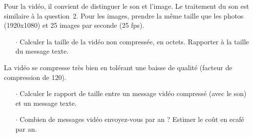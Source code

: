 


Pour la vidéo, il convient de distinguer le son et l'image. Le traitement du son est similaire à la question~2. Pour les images,
prendre la même taille que les photos (1920x1080) et 25 images par seconde (25 fps).

\begin{itemize}
\item[$\cdot$] Calculer la taille de la vidéo non compressée, en octets. Rapporter à la taille du message texte.
\end{itemize}

La vidéo se compresse très bien en tolérant une baisse de qualité  (facteur de compression de 120).
%
\begin{itemize}
\item[$\cdot$] Calculer le rapport de taille entre un message vidéo compressé (avec le son) et un message texte.
\item[$\cdot$] Combien de messages vidéo envoyez-vous par an ? Estimer le coût en ecafé par an.
\end{itemize}

